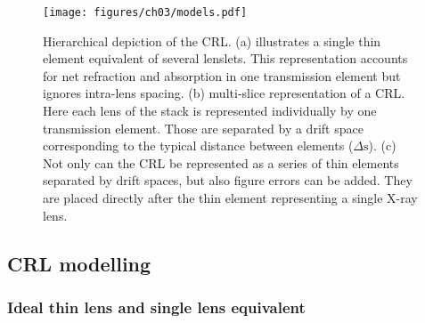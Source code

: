 \begin{refsection}

\begin{figure}[t]
    \centering
    {\texttt{[image: figures/ch03/models.pdf]}}
    \caption[Hierarchical CRL representation]{Hierarchical depiction of the CRL. (a) illustrates a single thin element equivalent of several lenslets. This representation accounts for net refraction and absorption in one transmission element but ignores intra-lens spacing. (b) multi-slice representation of a CRL. Here each lens of the stack is represented individually by one transmission element. Those are separated by a drift space corresponding to the typical distance between elements ($\Delta\text{s}$). (c) Not only can the CRL be represented as a series of thin elements separated by drift spaces, but also figure errors can be added. They are placed directly after the thin element representing a single X-ray lens.}
    \label{fig:models}
\end{figure}


\clearpage
\subsection{CRL modelling}\label{sec:CRL_modelling}

\subsubsection*{Ideal thin lens and single lens equivalent}


\end{refsection}
